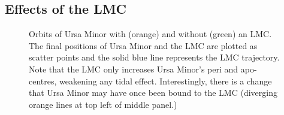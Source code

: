 \subsection{Effects of the LMC}\label{effects-of-the-lmc}

\begin{figure}
\centering
{}
\caption[Ursa Minor orbits with LMC]{Orbits of Ursa Minor with (orange)
and without (green) an LMC. The final positions of Ursa Minor and the
LMC are plotted as scatter points and the solid blue line represents the
LMC trajectory. Note that the LMC only increases Ursa Minor's peri and
apo-centres, weakening any tidal effect. Interestingly, there is a
change that Ursa Minor may have once been bound to the LMC (diverging
orange lines at top left of middle panel.)}
\end{figure}
